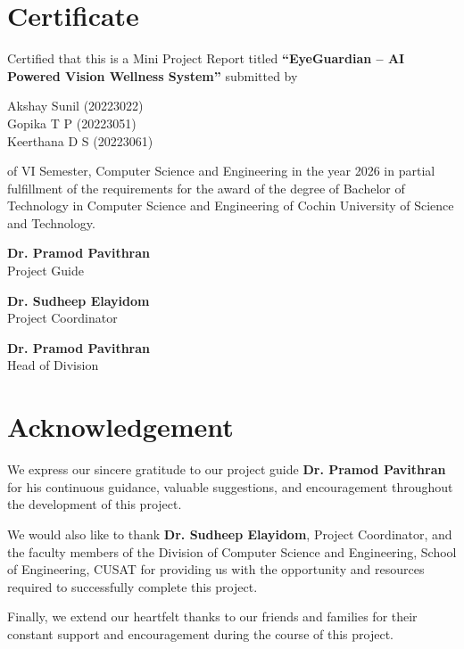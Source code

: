 \documentclass[12pt]{report}
\begin{document}
\chapter*{Certificate}

Certified that this is a Mini Project Report titled \textbf{“EyeGuardian – AI Powered Vision Wellness System”} submitted by

Akshay Sunil (20223022) \\
Gopika T P (20223051) \\
Keerthana D S (20223061)

of VI Semester, Computer Science and Engineering in the year 2026 in partial fulfillment of the requirements for the award of the degree of Bachelor of Technology in Computer Science and Engineering of Cochin University of Science and Technology.

\vspace{1cm}

\textbf{Dr. Pramod Pavithran} \\
Project Guide

\vspace{0.5cm}

\textbf{Dr. Sudheep Elayidom} \\
Project Coordinator

\vspace{0.5cm}

\textbf{Dr. Pramod Pavithran} \\
Head of Division


\chapter*{Acknowledgement}

We express our sincere gratitude to our project guide \textbf{Dr. Pramod Pavithran} for his continuous guidance, valuable suggestions, and encouragement throughout the development of this project. 

We would also like to thank \textbf{Dr. Sudheep Elayidom}, Project Coordinator, and the faculty members of the Division of Computer Science and Engineering, School of Engineering, CUSAT for providing us with the opportunity and resources required to successfully complete this project.

Finally, we extend our heartfelt thanks to our friends and families for their constant support and encouragement during the course of this project.
\end{document}
